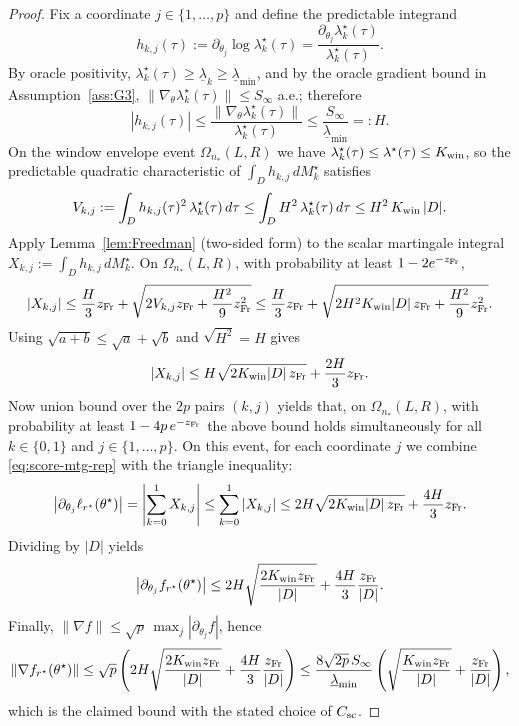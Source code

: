 \documentclass{statsoc}
\newcommand{\1}{\mathbbm{1}}
\begin{document}
\begin{proof}
Fix a coordinate $j\in\{1,\dots,p\}$ and define the predictable integrand
\[
h_{k,j}(\tau):=\partial_{\theta_j}\log\lambda_k^\star(\tau)
=\frac{\partial_{\theta_j}\lambda_k^\star(\tau)}{\lambda_k^\star(\tau)}.
\]
By oracle positivity, $\lambda_k^\star(\tau)\ge \underline\lambda_k\ge \underline\lambda_{\min}$, and by the oracle
gradient bound in Assumption~\ref{ass:G3},
$\|\nabla_\theta\lambda_k^\star(\tau)\|\le S_\infty$ a.e.; therefore
\[
|h_{k,j}(\tau)|
\le \frac{\|\nabla_\theta\lambda_k^\star(\tau)\|}{\lambda_k^\star(\tau)}
\le \frac{S_\infty}{\underline\lambda_{\min}}
=:H.
\]
On the window envelope event $\Omega_{n_*}(L,R)$ we have $\lambda_k^\star(\tau)\le \lambda^\star(\tau)\le K_{\rm win}$,
so the predictable quadratic characteristic of $\int_D h_{k,j}\,dM_k^\star$ satisfies
\[
V_{k,j}
:=\int_D h_{k,j}(\tau)^2\,\lambda_k^\star(\tau)\,d\tau
\le \int_D H^2\,\lambda_k^\star(\tau)\,d\tau
\le H^2\,K_{\rm win}\,|D|.
\]
Apply Lemma~\ref{lem:Freedman} (two-sided form) to the scalar martingale integral
$X_{k,j}:=\int_D h_{k,j}\,dM_k^\star$. On $\Omega_{n_*}(L,R)$, with probability at least $1-2e^{-z_{\rm Fr}}$,
\[
|X_{k,j}|
\le \frac{H}{3}z_{\rm Fr}+\sqrt{2V_{k,j}z_{\rm Fr}+\frac{H^2}{9}z_{\rm Fr}^2}
\le \frac{H}{3}z_{\rm Fr}+\sqrt{2H^2K_{\rm win}|D|\,z_{\rm Fr}+\frac{H^2}{9}z_{\rm Fr}^2}.
\]
Using $\sqrt{a+b}\le \sqrt a+\sqrt b$ and $\sqrt{H^2}=H$ gives
\[
|X_{k,j}|
\le H\sqrt{2K_{\rm win}|D|\,z_{\rm Fr}}+\frac{2H}{3}z_{\rm Fr}.
\]
Now union bound over the $2p$ pairs $(k,j)$ yields that, on $\Omega_{n_*}(L,R)$, with probability at least
$1-4p\,e^{-z_{\rm Fr}}$ the above bound holds simultaneously for all $k\in\{0,1\}$ and $j\in\{1,\dots,p\}$.
On this event, for each coordinate $j$ we combine \eqref{eq:score-mtg-rep} with the triangle inequality:
\[
\big|\partial_{\theta_j}\ell_{r^\star}(\theta^\star)\big|
=\left|\sum_{k=0}^1 X_{k,j}\right|
\le \sum_{k=0}^1|X_{k,j}|
\le 2H\sqrt{2K_{\rm win}|D|\,z_{\rm Fr}}+\frac{4H}{3}z_{\rm Fr}.
\]
Dividing by $|D|$ yields
\[
\big|\partial_{\theta_j} f_{r^\star}(\theta^\star)\big|
\le 2H\sqrt{\frac{2K_{\rm win}z_{\rm Fr}}{|D|}}+\frac{4H}{3}\frac{z_{\rm Fr}}{|D|}.
\]
Finally, $\|\nabla f\|\le \sqrt p\,\max_j|\partial_{\theta_j} f|$, hence
\[
\|\nabla f_{r^\star}(\theta^\star)\|
\le \sqrt p\left(2H\sqrt{\frac{2K_{\rm win}z_{\rm Fr}}{|D|}}+\frac{4H}{3}\frac{z_{\rm Fr}}{|D|}\right)
\le \frac{8\sqrt{2p}\,S_\infty}{\underline\lambda_{\min}}
\left(\sqrt{\frac{K_{\rm win}z_{\rm Fr}}{|D|}}+\frac{z_{\rm Fr}}{|D|}\right),
\]
which is the claimed bound with the stated choice of $C_{\rm sc}$.
\end{proof}
\end{document}
